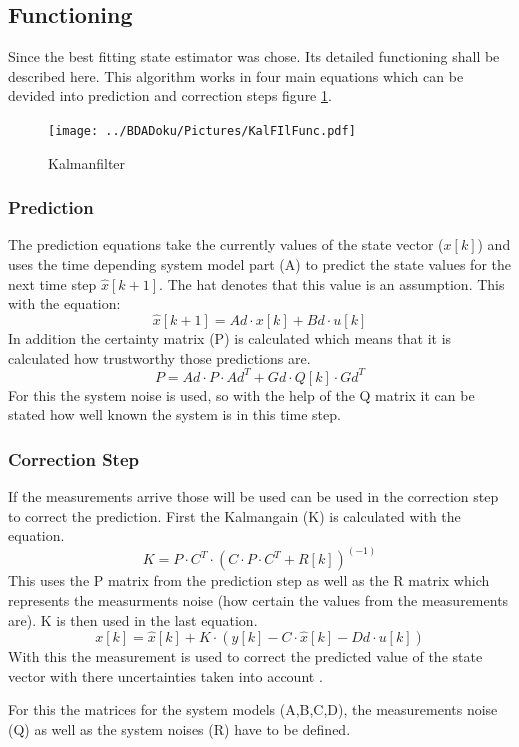   \subsection{Functioning}
  Since the best fitting state estimator was chose. Its detailed functioning shall be described here.
  This algorithm works in four main equations which can be devided into prediction and correction steps figure \ref{fig:Kalmanfilter}.

  \begin{figure}[h!]
    \centering
    \texttt{[image: ../BDADoku/Pictures/KalFIlFunc.pdf]}
    \caption{Kalmanfilter}
    \label{fig:Kalmanfilter}
  \end{figure}

  \subsubsection{Prediction}
  The prediction equations take the currently values of the state vector ($x[k]$)
  and uses the time depending system model part (A) to predict the state values for the next time step $\hat{x}[k+1]$.
  The hat denotes that this value is an assumption.
  This with the equation: $$ \hat{x}[k+1] = Ad\cdot x[k] + Bd\cdot u[k] $$
  In addition the certainty matrix (P) is calculated which means that it is calculated how trustworthy those predictions are.
  $$ P = Ad\cdot P\cdot Ad^T + Gd\cdot Q[k]\cdot Gd^T$$
  For this the system noise is used, so with the help of the Q matrix it can be stated how well known the system is in this
  time step.

  \subsubsection{Correction Step}
  If the measurements arrive those will be used can be used in the correction step to correct the prediction.
  First the Kalmangain (K) is calculated with the equation.
  $$ K = P\cdot C^T\cdot (C \cdot P \cdot C^T + R[k])^{(-1)} $$ 
  This uses the P matrix from the prediction step as well as the R matrix which represents the measurments noise (how certain the values from the measurements are).
  K is then used in the last equation. $$x[k] = \hat{x}[k] + K\cdot (y[k] - C\cdot \hat{x}[k]-Dd\cdot u[k])$$
  With this the measurement is used to correct the predicted value of the state vector with there uncertainties taken into account \cite{DavidWSchultz2004}. 

  For this the matrices for the system models (A,B,C,D), the measurements noise (Q) as well as the system noises (R) have to be defined.
  
  
  
  